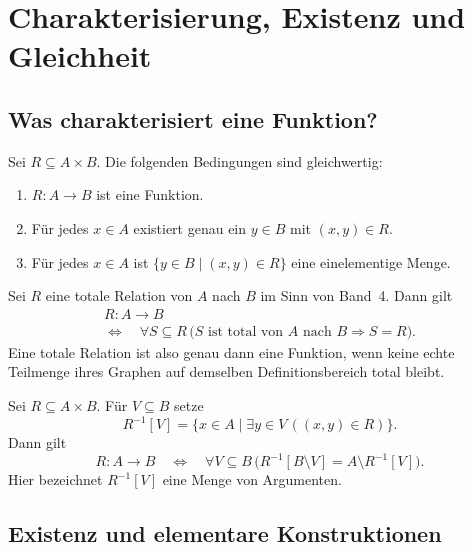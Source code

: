 \chapter{Charakterisierung, Existenz und Gleichheit}
\label{b05guide:ch:criteria}

\section{Was charakterisiert eine Funktion?}

\begin{theorem}
\label{b05guide:thm:criteria}
Sei $R\subseteq A\times B$. Die folgenden Bedingungen sind gleichwertig:
\begin{enumerate}
 \item $R\colon A\to B$ ist eine Funktion.
 \item Für jedes $x\in A$ existiert genau ein $y\in B$ mit $(x,y)\in R$.
 \item Für jedes $x\in A$ ist
       $\{y\in B\mid(x,y)\in R\}$ eine einelementige Menge.
\end{enumerate}
\end{theorem}

\begin{theorem}
\label{b05guide:thm:minimal}
Sei $R$ eine totale Relation von $A$ nach $B$ im Sinn von Band~4.
Dann gilt
\[
 \begin{gathered}
 R\colon A\to B\\
 \Longleftrightarrow\quad
 \forall S\subseteq R\,
 \bigl(S\text{ ist total von }A\text{ nach }B\Rightarrow S=R\bigr).
 \end{gathered}
\]
Eine totale Relation ist also genau dann eine Funktion,
wenn keine echte Teilmenge ihres Graphen auf demselben
Definitionsbereich total bleibt.
\end{theorem}

\begin{theorem}
\label{b05guide:thm:complementcriterion}
Sei $R\subseteq A\times B$. Für $V\subseteq B$ setze
\[
 R^{-1}[V]=\{x\in A\mid\exists y\in V\,((x,y)\in R)\}.
\]
Dann gilt
\[
 R\colon A\to B
 \quad\Longleftrightarrow\quad
 \forall V\subseteq B\,
   \bigl(R^{-1}[B\setminus V]=A\setminus R^{-1}[V]\bigr).
\]
Hier bezeichnet $R^{-1}[V]$ eine Menge von Argumenten.
\end{theorem}

\section{Existenz und elementare Konstruktionen}

